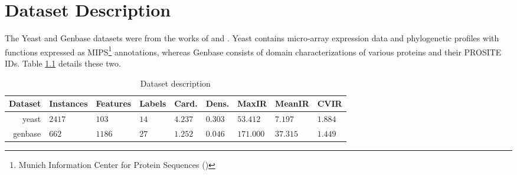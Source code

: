 %
%
%
%
%

\chapter{Dataset Description}
\label{AppendixDataset}

\par The Yeast and Genbase datasets were from the works of
\cite{elisseeff2001kernel} and \cite{diplaris2005protein}.  Yeast contains
micro-array expression data and phylogenetic profiles with functions expressed
as MIPS\footnote{ Munich Information Center for Protein Sequences
(\cite{mewes2006mips}) } annotations, whereas Genbase consists of domain
characterizations of various proteins and their PROSITE IDs. Table
\ref{setup:datasets} details these two.

\begin{table}[!h]
    \centering
    \caption{Dataset description}
    \label{setup:datasets}
    \begin{tabular}{@{}r*{8}{l}@{}}
        \toprule
        Dataset & Instances & Features & Labels & Card.    & Dens.   & MaxIR     & MeanIR   & CVIR     \\ \midrule
        yeast   & $2417$    & $103$    & $14$   & $4.237$  & $0.303$ & $53.412$  & $7.197$  & $1.884$  \\
        genbase & $662$     & $1186$   & $27$   & $1.252$  & $0.046$ & $171.000$ & $37.315$ & $1.449$  \\ \bottomrule
    \end{tabular}
\end{table}

